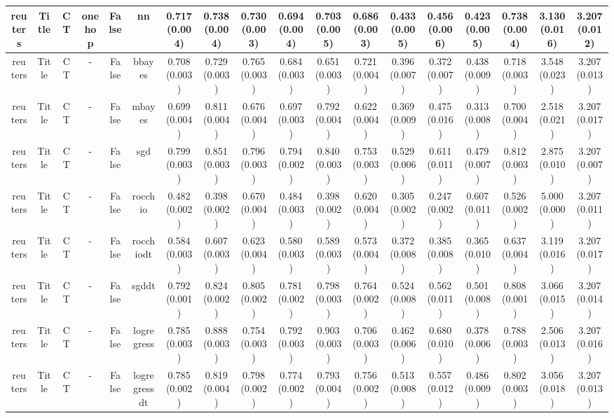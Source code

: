 \documentclass{article}
\begin{document}
{\begin{landscape}
\begin{table}[!h]
{\begin{tabular}{@{}cccccccccccccccccc@{}}
\midrule reuters & Title & CT & onehop & False & nn & 0.717 (0.004) & 0.738 (0.004) & 0.730 (0.003) & 0.694 (0.004) & 0.703 (0.005) & 0.686 (0.003) & 0.433 (0.005) & 0.456 (0.006) & 0.423 (0.005) &0.738 (0.004) & 3.130 (0.016) & 3.207 (0.012)\\
\midrule reuters & Title & CT & - & False & bbayes & 0.708 (0.003) & 0.729 (0.003) & 0.765 (0.003) & 0.684 (0.003) & 0.651 (0.003) & 0.721 (0.004) & 0.396 (0.007) & 0.372 (0.007) & 0.438 (0.009) &0.718 (0.003) & 3.548 (0.023) & 3.207 (0.013)\\
\midrule reuters & Title & CT & - & False & mbayes & 0.699 (0.004) & 0.811 (0.004) & 0.676 (0.004) & 0.697 (0.003) & 0.792 (0.004) & 0.622 (0.004) & 0.369 (0.009) & 0.475 (0.016) & 0.313 (0.008) &0.700 (0.004) & 2.518 (0.021) & 3.207 (0.017)\\
\midrule reuters & Title & CT & - & False & sgd & 0.799 (0.003) & 0.851 (0.003) & 0.796 (0.003) & 0.794 (0.002) & 0.840 (0.003) & 0.753 (0.003) & 0.529 (0.006) & 0.611 (0.011) & 0.479 (0.007) &0.812 (0.003) & 2.875 (0.010) & 3.207 (0.007)\\
\midrule reuters & Title & CT & - & False & rocchio & 0.482 (0.002) & 0.398 (0.002) & 0.670 (0.004) & 0.484 (0.003) & 0.398 (0.002) & 0.620 (0.004) & 0.305 (0.002) & 0.247 (0.002) & 0.607 (0.011) &0.526 (0.002) & 5.000 (0.000) & 3.207 (0.011)\\
\midrule reuters & Title & CT & - & False & rocchiodt & 0.584 (0.003) & 0.607 (0.003) & 0.623 (0.004) & 0.580 (0.003) & 0.589 (0.003) & 0.573 (0.004) & 0.372 (0.008) & 0.385 (0.008) & 0.365 (0.010) &0.637 (0.004) & 3.119 (0.016) & 3.207 (0.017)\\
\midrule reuters & Title & CT & - & False & sgddt & 0.792 (0.001) & 0.824 (0.002) & 0.805 (0.002) & 0.781 (0.002) & 0.798 (0.003) & 0.764 (0.002) & 0.524 (0.008) & 0.562 (0.011) & 0.501 (0.008) &0.808 (0.001) & 3.066 (0.015) & 3.207 (0.014)\\
\midrule reuters & Title & CT & - & False & logregress & 0.785 (0.003) & 0.888 (0.003) & 0.754 (0.003) & 0.792 (0.003) & 0.903 (0.003) & 0.706 (0.003) & 0.462 (0.006) & 0.680 (0.010) & 0.378 (0.006) &0.788 (0.003) & 2.506 (0.013) & 3.207 (0.016)\\
\midrule reuters & Title & CT & - & False & logregressdt & 0.785 (0.002) & 0.819 (0.004) & 0.798 (0.002) & 0.774 (0.002) & 0.793 (0.004) & 0.756 (0.002) & 0.513 (0.008) & 0.557 (0.012) & 0.486 (0.009) &0.802 (0.003) & 3.056 (0.018) & 3.207 (0.013)\\


\end{tabular}}
\end{table}
\end{landscape}}
\end{document}
